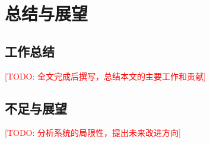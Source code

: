 \chapter{总结与展望}

\section{工作总结}

\textcolor{red}{[TODO: 全文完成后撰写，总结本文的主要工作和贡献]}

\section{不足与展望}

\textcolor{red}{[TODO: 分析系统的局限性，提出未来改进方向]}
